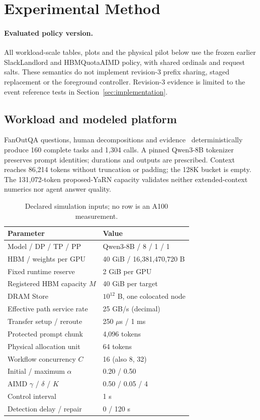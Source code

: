 \section{Experimental Method}
\label{sec:experimental-method}
\paragraph{Evaluated policy version.}
All workload-scale tables, plots and the physical pilot below use the frozen
earlier SlackLandlord and HBMQuotaAIMD policy, with shared ordinals and request salts. These
semantics do not implement revision-3 prefix sharing, staged replacement
or the foreground controller. Revision-3 evidence is limited to the event
reference tests in Section~\ref{sec:implementation}.
\subsection{Workload and modeled platform}
FanOutQA questions, human decompositions and evidence~\cite{zhu2024fanoutqa}
deterministically produce 160 complete tasks and 1,304 calls. A pinned
Qwen3-8B tokenizer~\cite{qwen2025technical} preserves prompt identities;
durations and outputs are prescribed. Context reaches 86,214 tokens without
truncation or padding; the 128K bucket is empty. The 131,072-token proposed-YaRN
capacity validates neither extended-context numerics nor agent answer quality.

\begin{table}[t]
\centering
\caption{Declared simulation inputs; no row is an A100 measurement.}
\label{tab:configuration}
\setlength{\tabcolsep}{3pt}
\begin{tabular}{@{}ll@{}}
\toprule
Parameter & Value \\
\midrule
Model / DP / TP / PP & Qwen3-8B / 8 / 1 / 1 \\
HBM / weights per GPU & 40 GiB / 16,381,470,720 B \\
Fixed runtime reserve & 2 GiB per GPU \\
Registered HBM capacity $M$ & 40 GiB per target \\
DRAM Store & $10^{12}$ B, one colocated node \\
Effective path service rate & 25 GB/s (decimal) \\
Transfer setup / reroute & 250 $\mu$s / 1 ms \\
Protected prompt chunk & 4,096 tokens \\
Physical allocation unit & 64 tokens \\
Workflow concurrency $C$ & 16 (also 8, 32) \\
Initial / maximum $\alpha$ & 0.20 / 0.50 \\
AIMD $\gamma$ / $\delta$ / $K$ & 0.50 / 0.05 / 4 \\
Control interval & 1 s \\
Detection delay / repair & 0 / 120 s \\
\bottomrule
\end{tabular}
\end{table}

